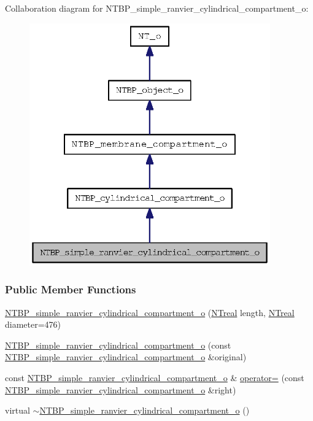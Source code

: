 Collaboration diagram for NTBP\_\-simple\_\-ranvier\_\-cylindrical\_\-compartment\_\-o:
\nopagebreak
\begin{figure}[H]
\begin{center}
\leavevmode
\includegraphics[width=294pt]{class_n_t_b_p__simple__ranvier__cylindrical__compartment__o__coll__graph}
\end{center}
\end{figure}
\subsubsection*{Public Member Functions}
\begin{DoxyCompactItemize}
\item 
\hyperlink{class_n_t_b_p__simple__ranvier__cylindrical__compartment__o_a4b683c42980a405a9db066db373a0665}{NTBP\_\-simple\_\-ranvier\_\-cylindrical\_\-compartment\_\-o} (\hyperlink{nt__types_8h_a814a97893e9deb1eedcc7604529ba80d}{NTreal} length, \hyperlink{nt__types_8h_a814a97893e9deb1eedcc7604529ba80d}{NTreal} diameter=476)
\item 
\hyperlink{class_n_t_b_p__simple__ranvier__cylindrical__compartment__o_ab8bbb054d5518cea20c5b31f29cd71d1}{NTBP\_\-simple\_\-ranvier\_\-cylindrical\_\-compartment\_\-o} (const \hyperlink{class_n_t_b_p__simple__ranvier__cylindrical__compartment__o}{NTBP\_\-simple\_\-ranvier\_\-cylindrical\_\-compartment\_\-o} \&original)
\item 
const \hyperlink{class_n_t_b_p__simple__ranvier__cylindrical__compartment__o}{NTBP\_\-simple\_\-ranvier\_\-cylindrical\_\-compartment\_\-o} \& \hyperlink{class_n_t_b_p__simple__ranvier__cylindrical__compartment__o_a70948417ef746916a7c110233b262d62}{operator=} (const \hyperlink{class_n_t_b_p__simple__ranvier__cylindrical__compartment__o}{NTBP\_\-simple\_\-ranvier\_\-cylindrical\_\-compartment\_\-o} \&right)
\item 
virtual \hyperlink{class_n_t_b_p__simple__ranvier__cylindrical__compartment__o_a0816ce85795f834ab00da679e463edee}{$\sim$NTBP\_\-simple\_\-ranvier\_\-cylindrical\_\-compartment\_\-o} ()
\end{DoxyCompactItemize}


